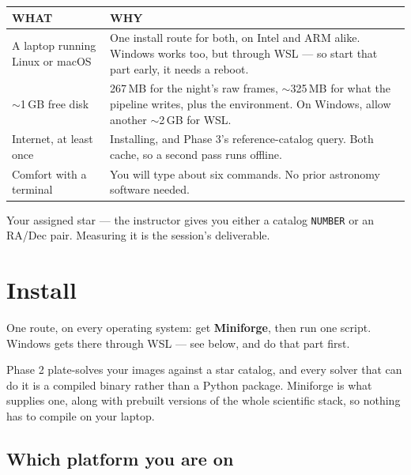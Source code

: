 \documentclass[11pt,a4paper]{article}
\newcommand{\cm}[1]{\texttt{\small #1}}
\newcommand{\thead}[1]{{\sffamily\bfseries\scriptsize\color{inkfaint}\MakeUppercase{#1}}}
\begin{document}
\vspace{4pt}
\begin{tabularx}{\textwidth}{@{}p{6.2cm}X@{}}
\toprule
\thead{What} & \thead{Why} \\
\midrule
A laptop running Linux or macOS & One install route for both, on Intel and ARM alike. Windows
works too, but through WSL --- so start that part early, it needs a reboot. \\
$\sim$1\,GB free disk & 267\,MB for the night's raw frames, $\sim$325\,MB for what the
pipeline writes, plus the environment. On Windows, allow another $\sim$2\,GB for WSL. \\
Internet, at least once & Installing, and Phase 3's reference-catalog query. Both cache, so a
second pass runs offline. \\
Comfort with a terminal & You will type about six commands. No prior astronomy software needed. \\
\bottomrule
\end{tabularx}

\begin{note}
Your assigned star --- the instructor gives you either a catalog \cm{NUMBER} or an RA/Dec pair.
Measuring it is the session's deliverable.
\end{note}

\section{Install}
One route, on every operating system: get \textbf{Miniforge}, then run one
script. Windows gets there through WSL --- see below, and do that part first.

\begin{note}
Phase 2 plate-solves your images against a star catalog, and every solver that
can do it is a compiled binary rather than a Python package. Miniforge is what
supplies one, along with prebuilt versions of the whole scientific stack, so
nothing has to compile on your laptop.
\end{note}

\subsection{Which platform you are on}
\end{document}
